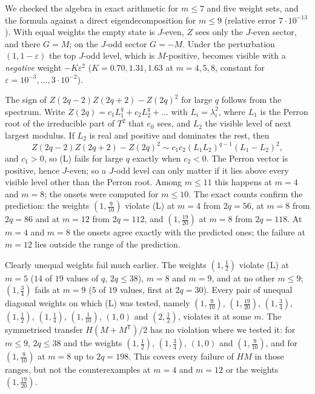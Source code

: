 \documentclass[11pt]{amsart}
\theoremstyle{definition}
\theoremstyle{remark}
\begin{document}
We checked the algebra in exact arithmetic for $m \le 7$ and five weight sets, and the formula
against a direct eigendecomposition for $m \le 9$ (relative error $7\cdot10^{-13}$). With equal
weights the empty state is $J$-even, $Z$ sees only the $J$-even sector, and there $G = M$; on the
$J$-odd sector $G = -M$. Under the perturbation $(1, 1 - \varepsilon)$ the top $J$-odd level, which
is $M$-positive, becomes visible with a \emph{negative} weight $-K\varepsilon^2$
($K = 0.70, 1.31, 1.63$ at $m = 4, 5, 8$, constant for $\varepsilon = 10^{-3}, \dots, 3\cdot10^{-2}$).

The sign of $Z(2q - 2)Z(2q + 2) - Z(2q)^2$ for large $q$ follows from the spectrum. Write
$Z(2q) = c_1 L_1^q + c_2 L_2^q + \dots$ with $L_i = \lambda_i^2$, where $L_1$ is the Perron root of
the irreducible part of $T^2$ that $e_0$ sees, and $L_2$ the visible level of next largest modulus.
If $L_2$ is real and positive and dominates the rest, then
\[
  Z(2q-2)Z(2q+2) - Z(2q)^2 \sim c_1 c_2 (L_1 L_2)^{q-1} (L_1 - L_2)^2 ,
\]
and $c_1 > 0$, so (L) fails for large $q$ exactly when $c_2 < 0$. The Perron vector is positive,
hence $J$-even; so a $J$-odd level can only matter if it lies above every visible level other than
the Perron root. Among $m \le 11$ this happens at $m = 4$ and $m = 8$; the onsets were computed for
$m \le 10$. The exact counts confirm the prediction: the weights $(1, \tfrac{9}{10})$ violate (L) at
$m = 4$ from $2q = 56$, at $m = 8$ from $2q = 86$ and at $m = 12$ from $2q = 112$, and
$(1, \tfrac{19}{20})$ at $m = 8$ from $2q = 118$. At $m = 4$ and $m = 8$ the onsets agree exactly with
the predicted ones; the failure at $m = 12$ lies outside the range of the prediction.

Clearly unequal weights fail much earlier. The weights $(1, \tfrac12)$ violate (L) at $m = 5$
($14$ of $19$ values of $q$, $2q \le 38$), $m = 8$ and $m = 9$, and at no other $m \le 9$;
$(1, \tfrac34)$ fails at $m = 9$ ($5$ of $19$ values, first at $2q = 30$). Every pair of unequal
diagonal weights on which (L) was tested, namely $(1, \tfrac{9}{10})$, $(1, \tfrac{19}{20})$,
$(1, \tfrac34)$, $(1, \tfrac12)$, $(1, \tfrac14)$, $(1, \tfrac{1}{10})$, $(1, 0)$ and
$(2, \tfrac12)$, violates it at some $m$. The symmetrised transfer $H(M + M^{\mathsf T})/2$ has no
violation where we tested it: for $m \le 9$, $2q \le 38$ and the weights $(1, \tfrac12)$,
$(1, \tfrac34)$, $(1, 0)$ and $(1, \tfrac{9}{10})$, and for $(1, \tfrac{9}{10})$ at $m = 8$ up to
$2q = 198$. This covers every failure of $HM$ in those ranges, but not the counterexamples at
$m = 4$ and $m = 12$ or the weights $(1, \tfrac{19}{20})$.
\end{document}
